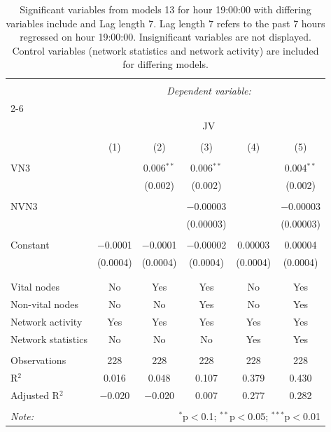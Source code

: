 
\begin{table}[!htbp] \centering 
  \caption{Significant variables from models 13 for hour 19:00:00 with differing variables include 
                               and Lag length 7. Lag length 7 refers to the past 7 hours regressed on hour 19:00:00. 
                               Insignificant variables are not displayed. 
                               Control variables (network statistics and network activity) are 
                               included for differing models.} 
  \label{Jmodels1_t_hourlagged6} 
\scriptsize 
\begin{tabular}{@{\extracolsep{5pt}}lccccc} 
\\[-1.8ex]\hline 
\hline \\[-1.8ex] 
 & \multicolumn{5}{c}{\textit{Dependent variable:}} \\ 
\cline{2-6} 
\\[-1.8ex] & \multicolumn{5}{c}{JV} \\ 
\\[-1.8ex] & (1) & (2) & (3) & (4) & (5)\\ 
\hline \\[-1.8ex] 
 VN3 &  & 0.006$^{**}$ & 0.006$^{**}$ &  & 0.004$^{**}$ \\ 
  &  & (0.002) & (0.002) &  & (0.002) \\ 
  & & & & & \\ 
 NVN3 &  &  & $-$0.00003 &  & $-$0.00003 \\ 
  &  &  & (0.00003) &  & (0.00003) \\ 
  & & & & & \\ 
 Constant & $-$0.0001 & $-$0.0001 & $-$0.00002 & 0.00003 & 0.00004 \\ 
  & (0.0004) & (0.0004) & (0.0004) & (0.0004) & (0.0004) \\ 
  & & & & & \\ 
\hline \\[-1.8ex] 
Vital nodes & No & Yes & Yes & No & Yes \\ 
Non-vital nodes & No & No & Yes & No & Yes \\ 
Network activity & Yes & Yes & Yes & Yes & Yes \\ 
Network statistics & No & No & No & Yes & Yes \\ 
\hline &  &  &  &  &  \\ 
Observations & 228 & 228 & 228 & 228 & 228 \\ 
R$^{2}$ & 0.016 & 0.048 & 0.107 & 0.379 & 0.430 \\ 
Adjusted R$^{2}$ & $-$0.020 & $-$0.020 & 0.007 & 0.277 & 0.282 \\ 
\hline 
\hline \\[-1.8ex] 
\textit{Note:}  & \multicolumn{5}{r}{$^{*}$p$<$0.1; $^{**}$p$<$0.05; $^{***}$p$<$0.01} \\ 
\end{tabular} 
\end{table} 
